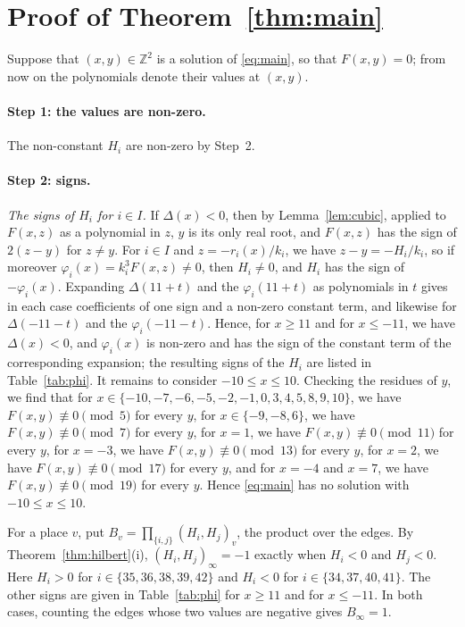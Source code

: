 \documentclass[11pt]{article}
\newcommand{\Z}{\mathbb{Z}}
\begin{document}
\section{Proof of Theorem~\ref{thm:main}}

Suppose that $(x,y)\in\Z^2$ is a solution of \eqref{eq:main}, so that $F(x,y)=0$; from now on the polynomials denote their values at $(x,y)$.
\paragraph{Step 1: the values are non-zero.} The non-constant $H_i$ are non-zero by Step~2.

\paragraph{Step 2: signs.} \emph{The signs of $H_i$ for $i\in I$.} If $\Delta(x)<0$, then by Lemma~\ref{lem:cubic}, applied to $F(x,z)$ as a polynomial in $z$, $y$ is its only real root, and $F(x,z)$ has the sign of $2(z-y)$ for $z\neq y$. For $i\in I$ and $z=-r_i(x)/k_i$, we have $z-y=-H_i/k_i$, so if moreover $\varphi_i(x)=k_i^3F(x,z)\neq0$, then $H_i\neq0$, and $H_i$ has the sign of $-\varphi_i(x)$. Expanding $\Delta(11+t)$ and the $\varphi_i(11+t)$ as polynomials in $t$ gives in each case coefficients of one sign and a non-zero constant term, and likewise for $\Delta(-11-t)$ and the $\varphi_i(-11-t)$. Hence, for $x\geq11$ and for $x\leq-11$, we have $\Delta(x)<0$, and $\varphi_i(x)$ is non-zero and has the sign of the constant term of the corresponding expansion; the resulting signs of the $H_i$ are listed in Table~\ref{tab:phi}. It remains to consider $-10\leq x\leq10$. Checking the residues of $y$, we find that for $x\in\{-10,\allowbreak -7,\allowbreak -6,\allowbreak -5,\allowbreak -2,\allowbreak -1,\allowbreak 0,\allowbreak 3,\allowbreak 4,\allowbreak 5,\allowbreak 8,\allowbreak 9,\allowbreak 10\}$, we have $F(x,y)\not\equiv0\pmod{5}$ for every $y$, for $x\in\{-9,\allowbreak -8,\allowbreak 6\}$, we have $F(x,y)\not\equiv0\pmod{7}$ for every $y$, for $x=1$, we have $F(x,y)\not\equiv0\pmod{11}$ for every $y$, for $x=-3$, we have $F(x,y)\not\equiv0\pmod{13}$ for every $y$, for $x=2$, we have $F(x,y)\not\equiv0\pmod{17}$ for every $y$, and for $x=-4$ and $x=7$, we have $F(x,y)\not\equiv0\pmod{19}$ for every $y$. Hence \eqref{eq:main} has no solution with $-10\leq x\leq10$.

For a place $v$, put $B_v=\prod_{\{i,j\}}(H_i,H_j)_v$, the product over the edges. By Theorem~\ref{thm:hilbert}(i), $(H_i,H_j)_\infty=-1$ exactly when $H_i<0$ and $H_j<0$. Here $H_i>0$ for $i\in\{35,\allowbreak 36,\allowbreak 38,\allowbreak 39,\allowbreak 42\}$ and $H_i<0$ for $i\in\{34,\allowbreak 37,\allowbreak 40,\allowbreak 41\}$. The other signs are given in Table~\ref{tab:phi} for $x\geq11$ and for $x\leq-11$. In both cases, counting the edges whose two values are negative gives $B_\infty=1$.
\end{document}

